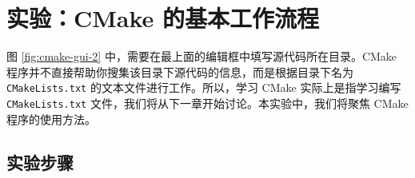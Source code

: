 
\section{实验：CMake 的基本工作流程\label{sec:experiment-3}}

图 \ref{fig:cmake-gui-2} 中，需要在最上面的编辑框中填写源代码所在目录。CMake 程序并不直接帮助你搜集该目录下源代码的信息，而是根据目录下名为 \lstinline[language={}]{CMakeLists.txt} 的文本文件进行工作。所以，学习 CMake 实际上是指学习编写 \lstinline[language={}]{CMakeLists.txt} 文件，我们将从下一章开始讨论。本实验中，我们将聚焦 CMake 程序的使用方法。

\subsection*{实验步骤}

